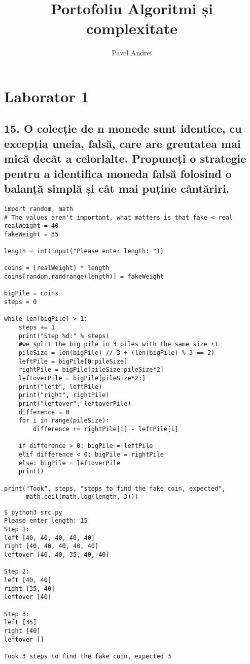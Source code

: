\documentclass[11pt]{article}
\author{Pavel Andrei}
\date{}
\title{Portofoliu Algoritmi și complexitate}
\begin{document}
\maketitle

\section*{Laborator 1}
\label{sec:org17955cc}
\subsection*{15. O colecție de n monede sunt identice, cu excepția uneia, falsă, care are greutatea mai mică decât a celorlalte. Propuneți o strategie pentru a identifica moneda falsă folosind o balanță simplă și cât mai puține cântăriri.}
\label{sec:org4ed4eed}

\begin{verbatim}
import random, math
# The values aren't important, what matters is that fake < real
realWeight = 40
fakeWeight = 35

length = int(input("Please enter length: "))

coins = [realWeight] * length
coins[random.randrange(length)] = fakeWeight

bigPile = coins
steps = 0

while len(bigPile) > 1:
    steps += 1
    print("Step %d:" % steps)
    #we split the big pile in 3 piles with the same size ±1
    pileSize = len(bigPile) // 3 + (len(bigPile) % 3 == 2)
    leftPile = bigPile[0:pileSize]
    rightPile = bigPile[pileSize:pileSize*2]
    leftoverPile = bigPile[pileSize*2:]
    print("left", leftPile)
    print("right", rightPile)
    print("leftover", leftoverPile)
    difference = 0
    for i in range(pileSize):
        difference += rightPile[i] - leftPile[i]

    if difference > 0: bigPile = leftPile
    elif difference < 0: bigPile = rightPile
    else: bigPile = leftoverPile
    print()

print("Took", steps, "steps to find the fake coin, expected", 
      math.ceil(math.log(length, 3)))
\end{verbatim}

\begin{verbatim}
$ python3 src.py
Please enter length: 15
Step 1:
left [40, 40, 40, 40, 40]
right [40, 40, 40, 40, 40]
leftover [40, 40, 35, 40, 40]

Step 2:
left [40, 40]
right [35, 40]
leftover [40]

Step 3:
left [35]
right [40]
leftover []

Took 3 steps to find the fake coin, expected 3
\end{verbatim}
\end{document}
